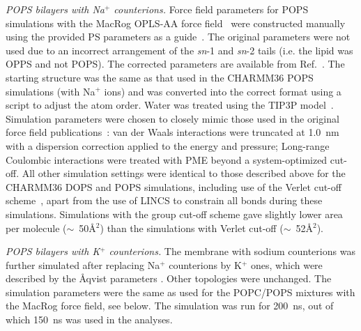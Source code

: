 \documentclass[journal=jpcbfk,manuscript=article]{achemso}
\newcommand{\todo}[1]{\textcolor{red}{#1}}
\begin{document}
\noindent
{\it POPS bilayers with Na$^+$ counterions.}
Force field parameters for POPS simulations with the MacRog OPLS-AA force field~\cite{maciejewski14,kulig15b,rog16}
were constructed manually using the provided PS parameters as a guide~\cite{rog16}. The original parameters were
not used due to an incorrect arrangement of the {\it sn}-1 and {\it sn}-2 tails (i.e. the lipid was OPPS and not POPS).
The corrected parameters are available from Ref.~.
The starting structure was the same as that used in the CHARMM36 POPS simulations (with Na$^+$ ions) and was converted into
the correct format using a script to adjust the atom order. Water was treated using the TIP3P model~\cite{jorgensen83}.
Simulation parameters were chosen to closely mimic those used in the original force field publications~\cite{maciejewski14,kulig15b,rog16}:
van der Waals interactions were truncated at 1.0~nm with a dispersion correction applied to the energy and pressure;
Long-range Coulombic interactions were treated with PME beyond a system-optimized cut-off.
All other simulation settings were identical to those described above for the CHARMM36 DOPS and POPS simulations,
including use of the Verlet cut-off scheme~\cite{Pall13}, apart from the use of LINCS to constrain all bonds during these simulations.
Simulations with the group cut-off scheme gave slightly lower area per molecule ($\sim$~50\AA$^2$) than
the simulations with Verlet cut-off ($\sim$~52\AA$^2$).

\noindent
{\it POPS bilayers with K$^+$ counterions.}
The membrane with sodium counterions was further simulated after replacing Na$^+$ counterions by K$^+$ ones, which 
were described by the \AA{}qvist parameters \cite{aqvist90}. Other topologies
were unchanged. The simulation parameters were the same as used for the POPC/POPS mixtures with 
the MacRog force field, see below. The simulation was run for 200~ns, out of which 150~ns was used 
in the analyses.
\end{document}
